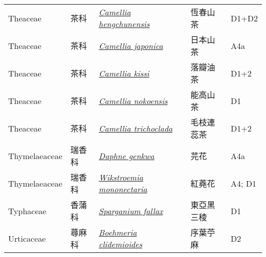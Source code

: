 {\begin{longtable}{L{2.5cm}L{2cm}L{5cm}L{2.5cm}L{3cm}}
    Theaceae & 茶科 & \href{http://www.theplantlist.org/tpl1.1/search?q=Camellia+hengchunensis}{\textit{Camellia hengchunensis} } & 恆春山茶 & D1+D2    \\
    Theaceae & 茶科 & \href{http://www.theplantlist.org/tpl1.1/search?q=Camellia+japonica}{\textit{Camellia japonica} } & 日本山茶 & A4a    \\
    Theaceae & 茶科 & \href{http://www.theplantlist.org/tpl1.1/search?q=Camellia+kissi}{\textit{Camellia kissi} } & 落瓣油茶 & D1+2    \\
    Theaceae & 茶科 & \href{http://www.theplantlist.org/tpl1.1/search?q=Camellia+nokoensis}{\textit{Camellia nokoensis} } & 能高山茶 & D1    \\
    Theaceae & 茶科 & \href{http://www.theplantlist.org/tpl1.1/search?q=Camellia+trichoclada}{\textit{Camellia trichoclada} } & 毛枝連蕊茶 & D1+2    \\
    Thymelaeaceae & 瑞香科 & \href{http://www.theplantlist.org/tpl1.1/search?q=Daphne+genkwa}{\textit{Daphne genkwa} } & 芫花 & A4a    \\
    Thymelaeaceae & 瑞香科 & \href{http://www.theplantlist.org/tpl1.1/search?q=Wikstroemia+mononectaria}{\textit{Wikstroemia mononectaria} } & 紅蕘花 & A4; D1    \\
    Typhaceae & 香蒲科 & \href{http://www.theplantlist.org/tpl1.1/search?q=Sparganium+fallax}{\textit{Sparganium fallax} } & 東亞黑三稜 & D1    \\
    Urticaceae & 蕁麻科 & \href{http://www.theplantlist.org/tpl1.1/search?q=Boehmeria+clidemioides}{\textit{Boehmeria clidemioides} } & 序葉苧麻 & D2    \\

\end{longtable}}
